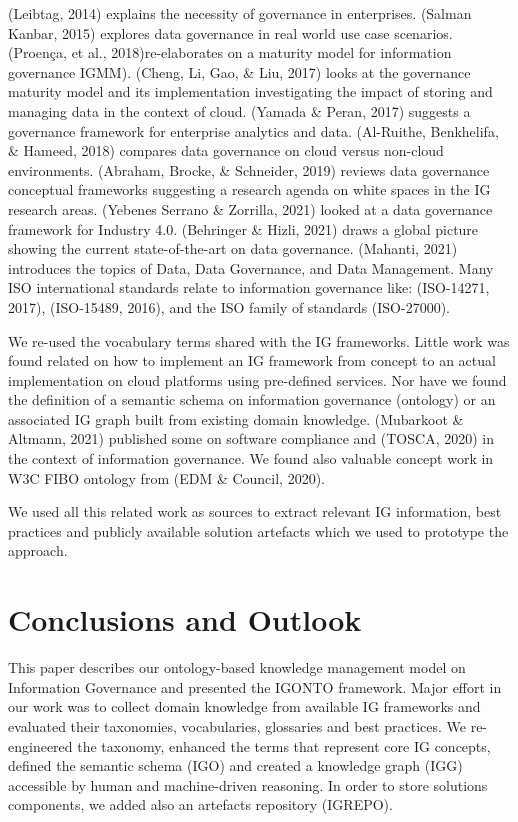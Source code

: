 \documentclass[runningheads]{llncs}
\begin{document}
(Leibtag, 2014) explains the necessity of governance in enterprises. (Salman Kanbar, 2015) explores data governance in real world use case scenarios. (Proença, et al., 2018)re-elaborates on a maturity model for information governance IGMM). (Cheng, Li, Gao, \& Liu, 2017) looks at the governance maturity model and its implementation investigating the impact of storing and managing data in the context of cloud. (Yamada \& Peran, 2017) suggests a governance framework for enterprise analytics and data. (Al-Ruithe, Benkhelifa, \& Hameed, 2018) compares data governance on cloud versus non-cloud environments. (Abraham, Brocke, \& Schneider, 2019) reviews data governance conceptual frameworks suggesting a research agenda on white spaces in the IG research areas. 
(Yebenes Serrano \& Zorrilla, 2021) looked at a data governance framework for Industry 4.0. (Behringer \& Hizli, 2021) draws a global picture showing the current state-of-the-art on data governance. (Mahanti, 2021) introduces the topics of Data, Data Governance, and Data Management. Many ISO international standards relate to information governance like: (ISO-14271, 2017), (ISO-15489, 2016), and the ISO family of standards (ISO-27000). 

We re-used the vocabulary terms shared with the IG frameworks. Little work was found related on how to implement an IG framework from concept to an actual implementation on cloud platforms using pre-defined services. Nor have we found the definition of a semantic schema on information governance (ontology) or an associated IG graph built from existing domain knowledge. (Mubarkoot \& Altmann, 2021) published some on software compliance and  (TOSCA, 2020) in the context of information governance. We found also valuable concept work in W3C FIBO ontology from (EDM \& Council, 2020). 

We used all this related work as sources to extract relevant IG information, best practices and publicly available solution artefacts which we used to prototype the approach.

\section{Conclusions and Outlook}
This paper describes our ontology-based knowledge management model on Information Governance and presented the IGONTO framework. Major effort in our work was to collect domain knowledge from available IG frameworks and evaluated their taxonomies, vocabularies, glossaries and best practices. We re-engineered the taxonomy, enhanced the terms that represent core IG concepts, defined the semantic schema (IGO) and created a knowledge graph (IGG) accessible by human and machine-driven reasoning. In order to store solutions components, we added also an artefacts repository (IGREPO). 
\end{document}
